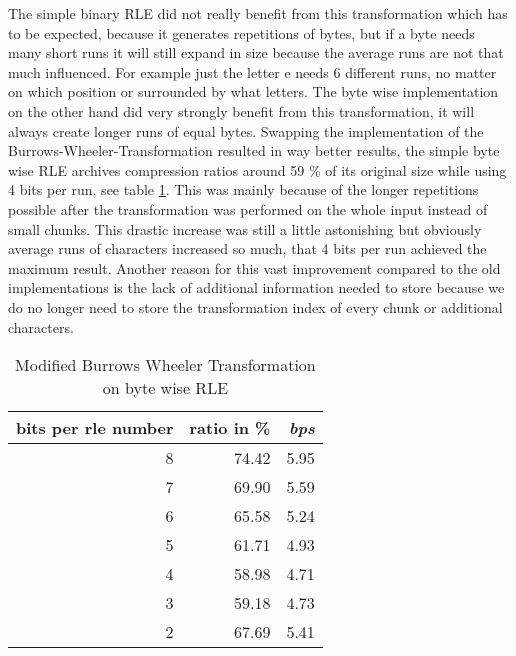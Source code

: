 \par{
The simple binary RLE did not really benefit from this transformation which has to be expected, because it generates repetitions of bytes, but if a byte needs many short runs it will still expand in size because the average runs are not that much influenced. For example just the letter e needs 6 different runs, no matter on which position or surrounded by what letters. The byte wise implementation on the other hand did very strongly benefit from this transformation, it will always create longer runs of equal bytes. Swapping the implementation of the Burrows-Wheeler-Transformation resulted in way better results, the simple byte wise RLE archives compression ratios around 59 \% of its original size while using 4 bits per run, see table \ref{tab:t13 Modified Burrows Wheeler Transformation on byte wise RLE}. This was mainly because of the longer repetitions possible after the transformation was performed on the whole input instead of small chunks. This drastic increase was still a little astonishing but obviously average runs of characters increased so much, that 4 bits per run achieved the maximum result. Another reason for this vast improvement compared to the old implementations is the lack of additional information needed to store because we do no longer need to store the transformation index of every chunk or additional characters.
	\begin{table}[h]
		\centering
		\begin{tabular}{r|r|r}	
			bits per rle number & ratio in \% & \textit{bps}\\
			\hline
			8 & 74.42 & 5.95\\
			7 & 69.90 & 5.59\\
			6 & 65.58 & 5.24\\
			5 & 61.71 & 4.93\\
			4 & 58.98 & 4.71\\
			3 & 59.18 & 4.73\\
			2 & 67.69 & 5.41
		\end{tabular}
		\caption{Modified Burrows Wheeler Transformation on byte wise RLE}
		\label{tab:t13 Modified Burrows Wheeler Transformation on byte wise RLE}
	\end{table}
}
